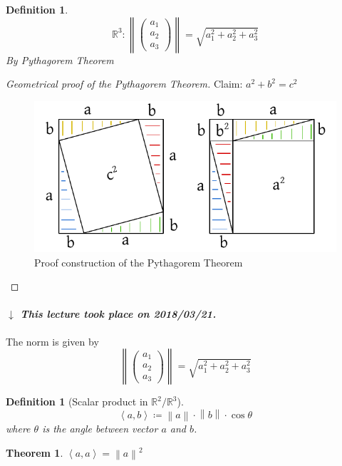 \documentclass[a4paper]{article}
\newcounter{lecref}[section]
\numberwithin{lecref}{section}
\newtheorem*{Theorem}{Theorem}
\newtheorem{definition}[lecref]{Definition}
\newtheorem*{Definition}{Definition}
\newcommand{\angel}[1]{\left\langle#1\right\rangle}
\newcommand{\norm}[1]{\left\|#1\right\|}
\newcommand{\dateref}[1]{%
  \begin{mdframed}[backgroundcolor=gray!10,innerbottommargin=0pt,innertopmargin=0pt]
    \paragraph{\textit{$\downarrow$ This lecture took place on #1.}}%
  \end{mdframed}%
}
\begin{document}
\begin{definition} %
  \[ \mathbb R^3: \norm{\begin{pmatrix} a_1 \\ a_2 \\ a_3 \end{pmatrix}} = \sqrt{a_1^2 + a_2^2 + a_3^2} \]
  By Pythagorem Theorem
\end{definition}

\begin{proof}[Geometrical proof of the Pythagorem Theorem]
  Claim: $a^2 + b^2 = c^2$

  \begin{figure}[!ht]
    \begin{center}
      \includegraphics{img/03_pytha.pdf}
      \caption{Proof construction of the Pythagorem Theorem}
      \label{fig:pytha}
    \end{center}
  \end{figure}
\end{proof}

\dateref{2018/03/21}

The norm is given by
\[ \norm{\begin{pmatrix} a_1 \\ a_2 \\ a_3 \end{pmatrix}} = \sqrt{a_1^2 + a_2^2 + a_3^2} \]

\begin{Definition}[Scalar product in $\mathbb R^2/\mathbb R^3$]
  \[ \angel{a, b} \coloneqq \norm{a} \cdot \norm{b} \cdot \cos{\theta} \]
  where $\theta$ is the angle between vector $a$ and $b$.
\end{Definition}

\begin{Theorem}
  $\angel{a,a} = \norm{a}^2$
\end{Theorem}
\end{document}
